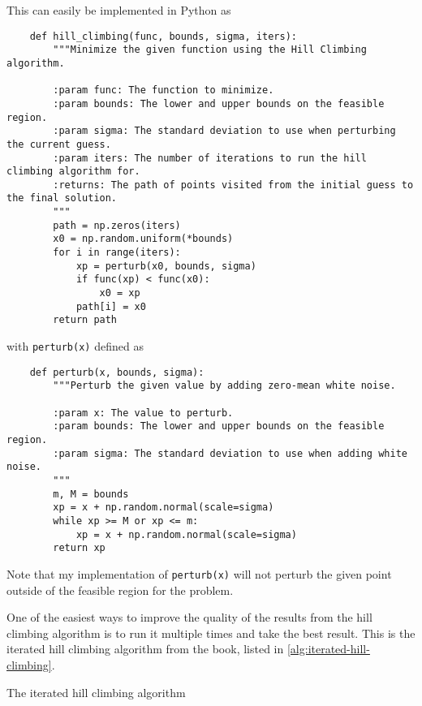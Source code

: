 \documentclass{article}
\begin{document}
This can easily be implemented in Python as

\begin{verbatim}
    def hill_climbing(func, bounds, sigma, iters):
        """Minimize the given function using the Hill Climbing algorithm.

        :param func: The function to minimize.
        :param bounds: The lower and upper bounds on the feasible region.
        :param sigma: The standard deviation to use when perturbing the current guess.
        :param iters: The number of iterations to run the hill climbing algorithm for.
        :returns: The path of points visited from the initial guess to the final solution.
        """
        path = np.zeros(iters)
        x0 = np.random.uniform(*bounds)
        for i in range(iters):
            xp = perturb(x0, bounds, sigma)
            if func(xp) < func(x0):
                x0 = xp
            path[i] = x0
        return path
\end{verbatim}

with \texttt{perturb(x)} defined as

\begin{verbatim}
    def perturb(x, bounds, sigma):
        """Perturb the given value by adding zero-mean white noise.

        :param x: The value to perturb.
        :param bounds: The lower and upper bounds on the feasible region.
        :param sigma: The standard deviation to use when adding white noise.
        """
        m, M = bounds
        xp = x + np.random.normal(scale=sigma)
        while xp >= M or xp <= m:
            xp = x + np.random.normal(scale=sigma)
        return xp
\end{verbatim}

Note that my implementation of \texttt{perturb(x)} will not perturb the given point
outside of the feasible region for the problem.

One of the easiest ways to improve the quality of the results from the hill climbing algorithm is
to run it multiple times and take the best result. This is the iterated hill climbing algorithm
from the book, listed in \autoref{alg:iterated-hill-climbing}.

\begin{algorithm}
    \begin{algorithmic}
            \State{}
        \EndFunction{}
    \end{algorithmic}
    \caption{The iterated hill climbing algorithm}\label{alg:iterated-hill-climbing}
\end{algorithm}
\end{document}
